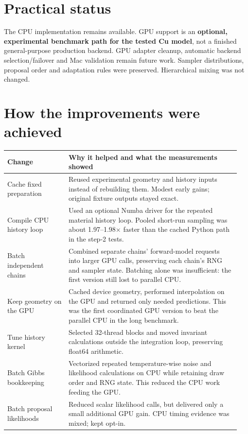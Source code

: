 \documentclass[11pt]{article}
\newcommand{\heading}[1]{\section*{#1}}
\begin{document}
\heading{Practical status}
The CPU implementation remains available. GPU support is an \textbf{optional,
experimental benchmark path for the tested Cu model}, not a finished general-purpose
production backend. GPU adapter cleanup, automatic backend selection/failover and
Mac validation remain future work. Sampler distributions, proposal order and
adaptation rules were preserved. Hierarchical mixing was not changed.

\newpage
\heading{How the improvements were achieved}
\renewcommand{\arraystretch}{1.2}
\begin{tabular}{@{}p{0.25\linewidth}p{0.70\linewidth}@{}}
\toprule
Change & Why it helped and what the measurements showed\\
\midrule
Cache fixed preparation & Reused experimental geometry and history inputs instead
of rebuilding them. Modest early gains; original fixture outputs stayed exact.\\
Compile CPU history loop & Used an optional Numba driver for the repeated material
history loop. Pooled short-run sampling was about 1.97--1.98$\times$ faster than
the cached Python path in the step-2 tests.\\
Batch independent chains & Combined separate chains' forward-model requests into
larger GPU calls, preserving each chain's RNG and sampler state. Batching alone
was insufficient: the first version still lost to parallel CPU.\\
Keep geometry on the GPU & Cached device geometry, performed interpolation on the
GPU and returned only needed predictions. This was the first coordinated GPU
version to beat the parallel CPU in the long benchmark.\\
Tune history kernel & Selected 32-thread blocks and moved invariant calculations
outside the integration loop, preserving float64 arithmetic.\\
Batch Gibbs bookkeeping & Vectorized repeated temperature-wise noise and likelihood
calculations on CPU while retaining draw order and RNG state. This reduced the
CPU work feeding the GPU.\\
Batch proposal likelihoods & Reduced scalar likelihood calls, but delivered only
a small additional GPU gain. CPU timing evidence was mixed; kept opt-in.\\
\bottomrule
\end{tabular}
\end{document}
